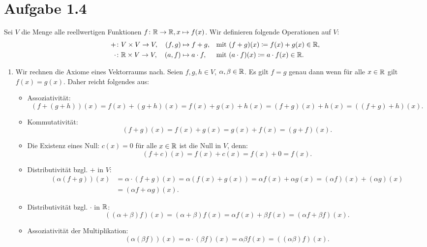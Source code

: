 \documentclass{theozettel}
\begin{document}
\section*{Aufgabe 1.4}
Sei $V$ die Menge alle reellwertigen Funktionen $f \colon \mathbb{R} \to \mathbb{R}, x \mapsto f(x)$. Wir definieren folgende Operationen auf $V$:
	\begin{align*}
		+ &\colon V \times V \to V, \ \ \ (f,g) \mapsto f+g, &&\text{mit} \ (f+g)(x) \coloneqq f(x) + g(x) \in \mathbb{R}, \\
		\cdot &\colon \mathbb{R} \times V \to V, \ \ \ (a,f) \mapsto a \cdot f, &&\text{mit} \ (a \cdot f)(x) \coloneqq a \cdot f(x) \in \mathbb{R}.
	\end{align*}
\begin{enumerate}
	\item 	Wir rechnen die Axiome eines Vektorraums nach. Seien $f,g,h \in V$, $\alpha, \beta \in \mathbb{R}$.  Es gilt $f=g$ genau dann wenn für alle $x \in \mathbb{R}$ gilt $f(x) = g(x)$. Daher reicht folgendes aus:
			\begin{itemize}
				\item 	Assoziativität: 
						\[
							\left(f+(g+h)\right)(x) = f(x) + (g+h)(x) = f(x) + g(x) + h(x) = (f+g)(x) + h(x) = \left((f+g)+h\right)(x).
						\]
				
				\item 	Kommutativität:
						\[
							(f+g)(x) = f(x) + g(x) = g(x) + f(x) = (g+f)(x).
						\]
				
				\item 	Die Existenz eines Null: $c(x) = 0$ für alle $x \in \mathbb{R}$ ist die Null in $V$, denn:
						\[
							(f+c)(x) = f(x) + c(x) = f(x) + 0 = f(x).
						\]
						
				\item 	Distributivität bzgl. $+$ in $V$:
						\begin{align*}
						\left(\alpha (f+g)\right)(x) & = \alpha \cdot (f+g)(x) = \alpha (f(x) + g(x)) = \alpha f(x) + \alpha g(x) = (\alpha f)(x) + (\alpha g)(x) \\ &= (\alpha f + \alpha g)(x).
						\end{align*}
				
				\item 	Distributivität bzgl. $\cdot$ in $\mathbb{R}$:
						\[
							((\alpha + \beta)f)(x) = (\alpha + \beta)f(x) = \alpha f(x) + \beta f(x) = (\alpha f + \beta f)(x).
						\]
				
				\item	Assoziativität der Multiplikation:
						\[
							(\alpha(\beta f))(x) = \alpha \cdot (\beta f)(x) = \alpha \beta f(x) = ((\alpha \beta)f)(x).
						\]
				

\end{itemize}
\end{enumerate}
\end{document}
